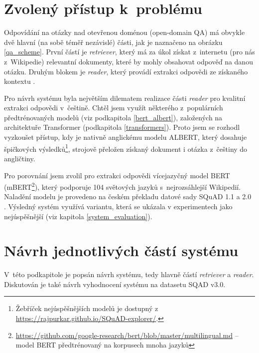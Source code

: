 \section{Zvolený přístup k~problému}
Odpovídání na otázky nad otevřenou doménou (open-domain QA) má obvykle dvě hlavní (na sobě téměř nezávislé) části, jak je naznačeno na obrázku \ref{qa_scheme}. První částí je \emph{retriever}, který má za úkol získat z~internetu (pro nás z~Wikipedie) relevantní dokumenty, které by mohly obsahovat odpověď na danou otázku. Druhým blokem je \emph{reader}, který provádí extrakci odpovědi ze získaného kontextu \cite{drQA}.\par
Pro návrh systému byla největším dilematem realizace části \emph{reader} pro kvalitní extrakci odpovědi v~češtině. Chtěl jsem využít některého z~populárních předtrénovaných modelů (viz podkapitola \ref{bert_albert}), založených na architektuře Transformer \cite{Transformers}  (podkapitola \ref{transformers}). Proto jsem se rozhodl vyzkoušet přístup, kdy je nativně anglickému modelu ALBERT, který dosahuje špičkových výsledků\footnote{Žebříček nejúspěšnějších modelů je dostupný z \url{https://rajpurkar.github.io/SQuAD-explorer/}.}, strojově přeložen získaný dokument i otázka z~češtiny do angličtiny.\par
Pro porovnání jsem zvolil pro extrakci odpovědi vícejazyčný model BERT (mBERT\footnote{\url{https://github.com/google-research/bert/blob/master/multilingual.md} -- model BERT předtrénovaný na korpusech mnoha jazyků}), který podporuje 104 světových jazyků s~nejrozsáhlejší Wikipedií. Naladění modelu je provedeno na českém překladu datové sady SQuAD 1.1 a 2.0 \cite{czech_squad,squad}. Výsledný systém využívá variantu, která se ukázala v experimentech jako nejúspěšnější (viz kapitola \ref{system_evaluation}).\par

\section{Návrh jednotlivých částí systému}
\label{design}
V~této podkapitole je popsán návrh systému, tedy hlavně částí \emph{retriever} a \emph{reader}. Diskutován je také návrh vyhodnocení systému na datasetu SQAD v3.0.

